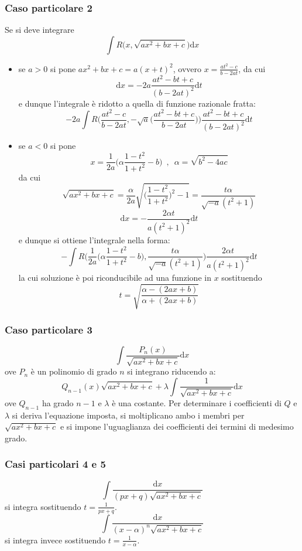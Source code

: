 \documentclass[10pt, oneside]{book}
\theoremstyle{plain}
\begin{document}
\subsubsection{Caso particolare 2}
Se si deve integrare
\[\int R\big(x, \sqrt{ax^2 +bx +c}\big)\textrm{d}x\]
\begin{itemize}
\item se $a > 0$ si pone $ax^2 + bx + c = a(x+t)^2$, ovvero $\displaystyle x = \frac{at^2 - c}{b - 2at}$, da cui
\[\textrm{d}x = - 2a \frac{at^2 - bt + c}{(b - 2at)^2	}\textrm{d}t\]
e dunque l'integrale è ridotto a quella di funzione razionale fratta:
\[-2a \int R \bigg(\frac{at^2 - c}{b - 2at}, - \sqrt{a}\big(\frac{at^2 - bt + c}{b-2at}\big)\bigg)\frac{at^2 - bt + c}{(b - 2at)^2	}\textrm{d}t\]
\item se $a < 0$ si pone
\[x = \frac{1}{2a} \big(\alpha \frac{1-t^2}{1+t^2} - b\big) \enspace, \enspace \alpha = \sqrt{b^2 - 4ac}\]
da cui
\[\sqrt{ax^2 + bx + c} = \frac{\alpha}{2a}\sqrt{\big(\frac{1-t^2}{1+t^2}\big)^2 - 1} = \frac{t\alpha}{\sqrt{-a}(t^2+1)}\]
\[\textrm{d}x = - \frac{2\alpha t}{a(t^2 + 1)^2}\textrm{d}t\]
e dunque si ottiene l'integrale nella forma:
\[- \int R \bigg(\frac{1}{2a} \big(\alpha \frac{1-t^2}{1+t^2} - b\big), \frac{t\alpha}{\sqrt{-a}(t^2+1)}\bigg)\frac{2\alpha t}{a(t^2+1)^2}\textrm{d}t\]
la cui soluzione è poi riconducibile ad una funzione in $x$ sostituendo
\[t = \sqrt{\frac{\alpha - (2ax + b)}{\alpha + (2ax + b)}}\]
\end{itemize}
\subsubsection{Caso particolare 3}
\[\int\frac{P_n(x)}{\sqrt{ax^2 + bx + c}}\textrm{d}x\]
ove $P_n$ è un polinomio di grado $n$ si integrano riducendo a:
\[Q_{n-1}(x)\sqrt{ax^2 + bx + c} + \lambda \int\frac{1}{\sqrt{ax^2 + bx + c}}\textrm{d}x\]
ove $Q_{n-1}$ ha grado $n-1$ e $\lambda$ è una costante. Per determinare i coefficienti di $Q$ e $\lambda$ si deriva l'equazione imposta, si moltiplicano ambo i membri per $\sqrt{ax^2 + bx + c}$ e si impone l'uguaglianza dei coefficienti dei termini di medesimo grado.
\subsubsection{Casi particolari 4 e 5}
\[\int\frac{\textrm{d}x}{(px + q)\sqrt{ax^2 + bx + c}}\]
si integra sostituendo $\displaystyle t = \frac{1}{px + q}$.
\[\int\frac{\textrm{d}x}{(x - \alpha)^n \sqrt{ax^2 + bx + c}}\]
si integra invece sostituendo $\displaystyle t = \frac{1}{x-\alpha}$.
\end{document}
